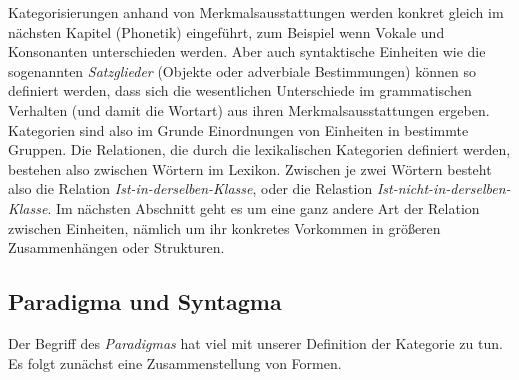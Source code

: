 
Kategorisierungen anhand von Merkmalsausstattungen werden konkret gleich im nächsten Kapitel (Phonetik) eingeführt, zum Beispiel wenn Vokale und Konsonanten unterschieden werden.
Aber auch syntaktische Einheiten wie die sogenannten \textit{Satzglieder} (\zB Objekte oder adverbiale Bestimmungen) können so definiert werden, dass sich die wesentlichen Unterschiede im grammatischen Verhalten (und damit die Wortart) aus ihren Merkmalsausstattungen ergeben.
Kategorien sind also im Grunde Einordnungen von Einheiten in bestimmte Gruppen.
Die Relationen, die durch die lexikalischen Kategorien definiert werden, bestehen also zwischen Wörtern im Lexikon.
Zwischen je zwei Wörtern besteht also die Relation \textit{Ist-in-derselben-Klasse}, oder die Relastion \textit{Ist-nicht-in-derselben-Klasse}.
Im nächsten Abschnitt geht es um eine ganz andere Art der Relation zwischen Einheiten, nämlich um ihr konkretes Vorkommen in größeren Zusammenhängen oder Strukturen.

\subsection{Paradigma und Syntagma}

\label{sec:paradigmasyntagma}

Der Begriff des \textit{Paradigmas} hat viel mit unserer Definition der Kategorie zu tun.
Es folgt zunächst eine Zusammenstellung von Formen.

\begin{exe}
  \ex\label{ex:gb8991}
  \begin{xlist}
  \end{xlist}
  \ex\label{ex:gb8992}
  \begin{xlist}
  \end{xlist}
  \ex\label{ex:gb8993}
  \begin{xlist}
  \end{xlist}
  \ex\label{ex:gb8994}
  \begin{xlist}
  \end{xlist}
  \ex\label{ex:gb8995}
  \begin{xlist}
  \end{xlist}
\end{exe}

